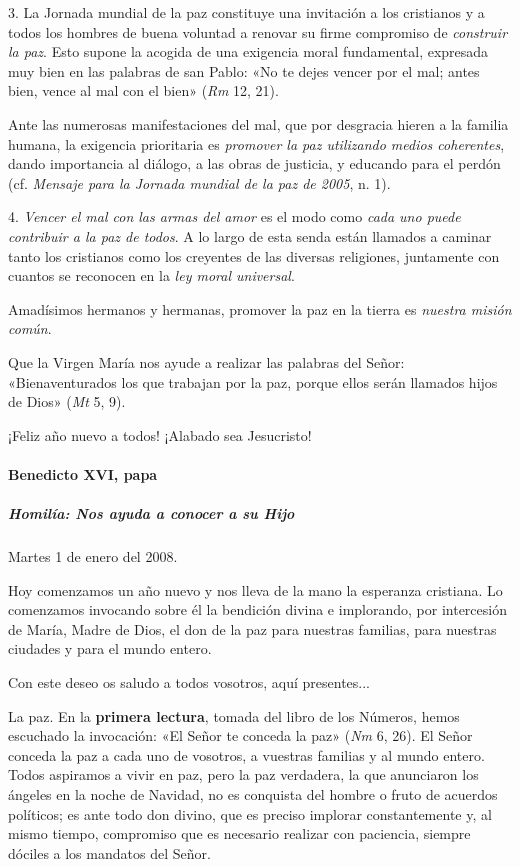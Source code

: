 \documentclass[]{article}
\let\oldparagraph\paragraph
\renewcommand{\paragraph}[1]{\oldparagraph{#1}\mbox{}}
\let\oldsubparagraph\subparagraph
\renewcommand{\subparagraph}[1]{\oldsubparagraph{#1}\mbox{}}
\begin{document}
3. La Jornada mundial de la paz constituye una invitación a los
cristianos y a todos los hombres de buena voluntad a renovar su firme
compromiso de \emph{construir la paz}. Esto supone la acogida de una
exigencia moral fundamental, expresada muy bien en las palabras de san
Pablo: «No te dejes vencer por el mal; antes bien, vence al mal con el
bien» (\emph{Rm} 12, 21).

Ante las numerosas manifestaciones del mal, que por desgracia hieren a
la familia humana, la exigencia prioritaria es \emph{promover la paz
utilizando medios coherentes}, dando importancia al diálogo, a las obras
de justicia, y educando para el perdón (cf. \emph{Mensaje para la
Jornada mundial de la paz de 2005}, n. 1).

4. \emph{Vencer el mal con las armas del amor} es el modo como
\emph{cada uno puede contribuir a la paz de todos}. A lo largo de esta
senda están llamados a caminar tanto los cristianos como los creyentes
de las diversas religiones, juntamente con cuantos se reconocen en la
\emph{ley moral universal}.

Amadísimos hermanos y hermanas, promover la paz en la tierra es
\emph{nuestra misión común}.

Que la Virgen María nos ayude a realizar las palabras del Señor:
«Bienaventurados los que trabajan por la paz, porque ellos serán
llamados hijos de Dios» (\emph{Mt} 5, 9).

¡Feliz año nuevo a todos! ¡Alabado sea Jesucristo!

\paragraph{Benedicto XVI, papa}\label{benedicto-xvi-papa-7}

\subparagraph{Homilía: Nos ayuda a conocer a su
Hijo}\label{homiluxeda-nos-ayuda-a-conocer-a-su-hijo}

Martes 1 de enero del 2008.

Hoy comenzamos un año nuevo y nos lleva de la mano la esperanza
cristiana. Lo comenzamos invocando sobre él la bendición divina e
implorando, por intercesión de María, Madre de Dios, el don de la paz
para nuestras familias, para nuestras ciudades y para el mundo entero.

Con este deseo os saludo a todos vosotros, aquí presentes...

La paz. En la \textbf{primera lectura}, tomada del libro de los Números,
hemos escuchado la invocación: «El Señor te conceda la paz» (\emph{Nm}
6, 26). El Señor conceda la paz a cada uno de vosotros, a vuestras
familias y al mundo entero. Todos aspiramos a vivir en paz, pero la paz
verdadera, la que anunciaron los ángeles en la noche de Navidad, no es
conquista del hombre o fruto de acuerdos políticos; es ante todo don
divino, que es preciso implorar constantemente y, al mismo tiempo,
compromiso que es necesario realizar con paciencia, siempre dóciles a
los mandatos del Señor.
\end{document}

